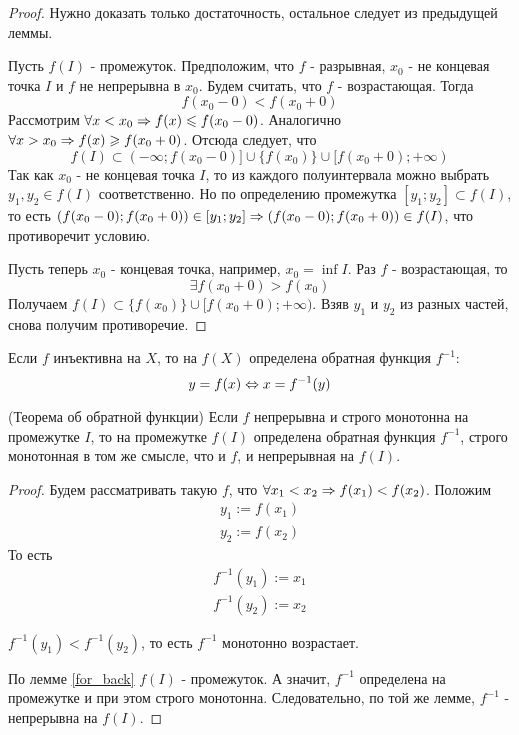 \begin{proof}
	Нужно доказать только достаточность, остальное следует из предыдущей леммы.
	
	Пусть $f(I)$ - промежуток. Предположим, что $f$ - разрывная, $x_0$ - не концевая точка $I$ и $f$ не непрерывна в $x_0$. Будем считать, что $f$ - возрастающая. Тогда
	$$
		f(x_0 - 0) < f(x_0 + 0)
	$$
	Рассмотрим $\forall x < x_0 \Rightarrow f(x) \leqslant f(x_0 - 0)$. Аналогично $\forall x > x_0 \Rightarrow f(x) \geqslant f(x_0 + 0)$. Отсюда следует, что
	\[
		f(I) \subset (-\infty; f(x_0 - 0)] \cup \{f(x_0)\} \cup [f(x_0 + 0); +\infty)
	\]
	Так как $x_0$ - не концевая точка $I$, то из каждого полуинтервала можно выбрать $y_1, y_2 \in f(I)$ соответственно. Но по определению промежутка $[y_1; y_2] \subset f(I)$, то есть $(f(x_0 - 0); f(x_0 + 0)) \in [y_1; y_2] \Rightarrow (f(x_0 - 0); f(x_0 + 0)) \in f(I)$, что противоречит условию.
	
	Пусть теперь $x_0$ - концевая точка, например, $x_0 = \inf I$. Раз $f$ - возрастающая, то
	\[
		\exists f(x_0 + 0) > f(x_0)
	\]
	Получаем $f(I) \subset \{f(x_0)\} \cup [f(x_0 + 0); +\infty)$. Взяв $y_1$ и $y_2$ из разных частей, снова получим противоречие.
\end{proof}

\begin{definition}
	Если $f$ инъективна на $X$, то на $f(X)$ определена обратная функция $f^{-1}$:
	$$
		y = f(x) \Leftrightarrow x = f^{-1}(y)
	$$
\end{definition}

\begin{theorem} (Теорема об обратной функции)
	Если $f$ непрерывна и строго монотонна на промежутке $I$, то на промежутке $f(I)$ определена обратная функция $f^{-1}$, строго монотонная в том же смысле, что и $f$, и непрерывная на $f(I)$.
\end{theorem}

\begin{proof}
	Будем рассматривать такую $f$, что $\forall x_1 < x_2 \Rightarrow f(x_1) < f(x_2)$. Положим
	\begin{align*}
		y_1 := f(x_1)
		\\
		y_2 := f(x_2)
	\end{align*}
	То есть
	\begin{align*}
		f^{-1}(y_1) := x_1
		\\
		f^{-1}(y_2) := x_2
	\end{align*}
	
	$f^{-1}(y_1) < f^{-1}(y_2)$, то есть $f^{-1}$ монотонно возрастает.
	
	По лемме \ref{for_back} $f(I)$ - промежуток. А значит, $f^{-1}$ определена на промежутке и при этом строго монотонна. Следовательно, по той же лемме, $f^{-1}$ - непрерывна на $f(I)$.
\end{proof}

